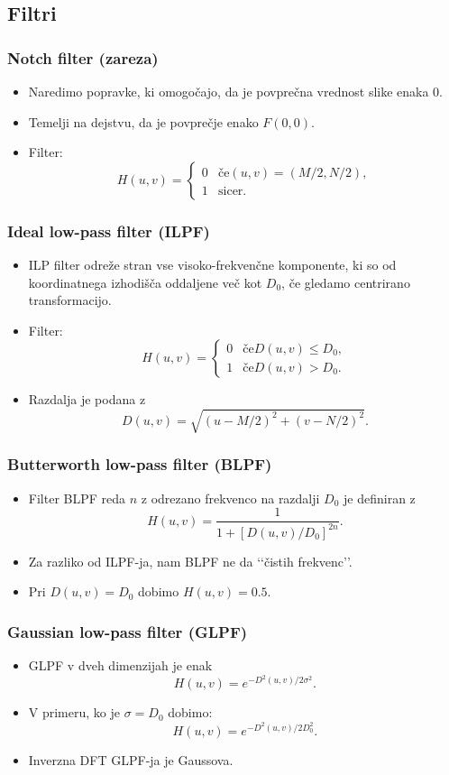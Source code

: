 \subsection{Filtri}
\subsubsection{Notch filter (zareza)}
\begin{itemize}
\item Naredimo popravke, ki omogočajo, da je povprečna vrednost slike enaka 0.
\item Temelji na dejstvu, da je povprečje enako $F(0,0)$.
\item Filter:
$$H(u,v) =
  \begin{cases}
    0 & \text{če} (u,v) = (M/2, N/2),\\
   1 & \text{sicer.}
  \end{cases}
$$
\end{itemize}
%
\subsubsection{Ideal low-pass filter (ILPF)}
\begin{itemize}
\item ILP filter odreže stran vse visoko-frekvenčne komponente, ki so od koordinatnega izhodišča oddaljene več kot $D_0$, če gledamo centrirano transformacijo.
\item Filter:
$$H(u,v) =
  \begin{cases}
    0 & \mbox{če} D(u,v) \leq D_0,\\
    1 & \mbox{če} D(u,v) > D_0.
  \end{cases}
$$
\item Razdalja je podana z
$$D(u,v) = \sqrt{(u-M/2)^2 + (v-N/2)^2}.$$
\end{itemize}
%
\subsubsection{Butterworth low-pass filter (BLPF)}
\begin{itemize}
\item Filter BLPF reda $n$ z odrezano frekvenco na razdalji $D_0$ je definiran z
$$H(u,v) = \frac{1}{1+[D(u,v)/D_0]^{2n}}.$$
\item Za razliko od ILPF-ja, nam BLPF ne da \lq\lq{čistih frekvenc}\rq\rq.
\item Pri $D(u,v) = D_0$ dobimo $H(u,v) = 0.5$.
\end{itemize}
%
\subsubsection{Gaussian low-pass filter (GLPF)}
\begin{itemize}
\item GLPF v dveh dimenzijah je enak
$$H(u,v) = e^{-D^2(u,v)/2\sigma^2}.$$
\item V primeru, ko je $\sigma = D_0$ dobimo:
$$H(u,v) = e^{-D^2(u,v)/2D_0^2}.$$
\item Inverzna DFT GLPF-ja je Gaussova.
\end{itemize}
%
